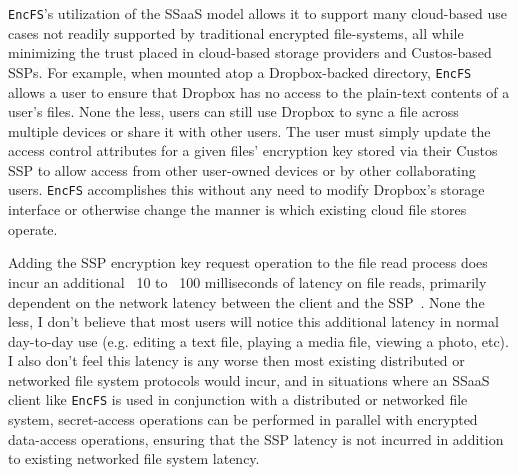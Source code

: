 \texttt{EncFS}'s utilization of the SSaaS model allows it to support
many cloud-based use cases not readily supported by traditional
encrypted file-systems, all while minimizing the trust placed in
cloud-based storage providers and Custos-based SSPs. For example, when
mounted atop a Dropbox-backed directory, \texttt{EncFS} allows a user
to ensure that Dropbox has no access to the plain-text contents of a
user's files. None the less, users can still use Dropbox to sync a
file across multiple devices or share it with other users. The user
must simply update the access control attributes for a given files'
encryption key stored via their Custos SSP to allow access from other
user-owned devices or by other collaborating users. \texttt{EncFS}
accomplishes this without any need to modify Dropbox's storage
interface or otherwise change the manner is which existing cloud file
stores operate.

Adding the SSP encryption key request operation to the file read
process does incur an additional ~10 to ~100 milliseconds of latency
on file reads, primarily dependent on the network latency between the
client and the SSP~\cite{custos-trios}. None the less, I don't believe
that most users will notice this additional latency in normal
day-to-day use (e.g. editing a text file, playing a media file,
viewing a photo, etc). I also don't feel this latency is any worse
then most existing distributed or networked file system protocols
would incur, and in situations where an SSaaS client like
\texttt{EncFS} is used in conjunction with a distributed or networked
file system, secret-access operations can be performed in parallel
with encrypted data-access operations, ensuring that the SSP latency
is not incurred in addition to existing networked file system latency.

